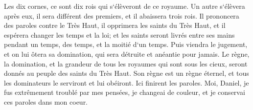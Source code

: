 \verse Les dix cornes, ce sont dix rois qui s`élèveront de ce royaume. Un autre s`élèvera après eux, il sera différent des premiers, et il abaissera trois rois. 
\verse Il prononcera des paroles contre le Très Haut, il opprimera les saints du Très Haut, et il espérera changer les temps et la loi; et les saints seront livrés entre ses mains pendant un temps, des temps, et la moitié d`un temps. 
\verse Puis viendra le jugement, et on lui ôtera sa domination, qui sera détruite et anéantie pour jamais. 
\verse Le règne, la domination, et la grandeur de tous les royaumes qui sont sous les cieux, seront donnés au peuple des saints du Très Haut. Son règne est un règne éternel, et tous les dominateurs le serviront et lui obéiront. 
\verse Ici finirent les paroles. Moi, Daniel, je fus extrêmement troublé par mes pensées, je changeai de couleur, et je conservai ces paroles dans mon coeur. 

